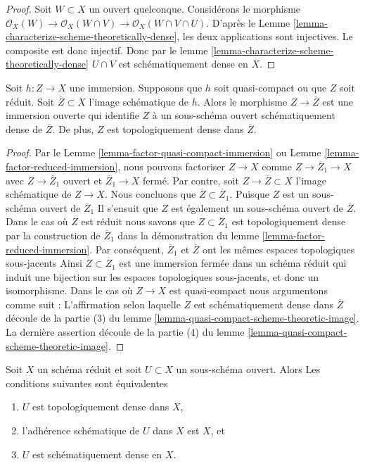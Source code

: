 \begin{proof}
Soit $W \subset X$ un ouvert
quelconque. Considérons le morphisme
$\mathcal{O}_X(W) \to \mathcal{O}_X(W \cap V)
\to \mathcal{O}_X(W \cap V \cap U)$. D'après le Lemme \ref{lemma-characterize-scheme-theoretically-dense},
les deux applications sont injectives.
Le composite est donc injectif. Donc
par le lemme \ref{lemma-characterize-scheme-theoretically-dense} $U \cap V$ est schématiquement
dense en $X$.
\end{proof}

\begin{lemma}
\label{lemma-quasi-compact-immersion}
Soit $h : Z \to X$ une immersion. Supposons que $h$ soit quasi-compact
ou que $Z$ soit réduit. Soit $\overline{Z} \subset X$ l'image schématique de
$h$. Alors le morphisme $Z \to \overline{Z}$ est une immersion ouverte qui identifie
$Z$ à un sous-schéma ouvert schématiquement
dense de $\overline{Z}$. De plus, $Z$ est topologiquement
dense dans $\overline{Z}$.
\end{lemma}

\begin{proof}
Par le Lemme \ref{lemma-factor-quasi-compact-immersion} ou Lemme \ref{lemma-factor-reduced-immersion}, nous
pouvons factoriser $Z \to X$ comme $Z \to \overline{Z}_1 \to X$
avec $Z \to \overline{Z}_1$ ouvert et $\overline{Z}_1 \to X$ fermé. Par contre, soit
$Z \to \overline{Z} \subset X$ l'image schématique de $Z \to X$. Nous
concluons que $\overline{Z} \subset \overline{Z}_1$. Puisque $Z$ est un sous-schéma
ouvert de $\overline{Z}_1$ Il s'ensuit que $Z$
est également un sous-schéma ouvert de $\overline{Z}$.
Dans le cas où $Z$ est réduit nous savons
que $Z \subset \overline{Z}_1$ est topologiquement dense par la construction
de $\overline{Z}_1$ dans la démonstration du lemme \ref{lemma-factor-reduced-immersion}.
Par conséquent, $\overline{Z}_1$ et $\overline{Z}$ ont
les mêmes espaces topologiques sous-jacents
Ainsi $\overline{Z} \subset \overline{Z}_1$ est une immersion fermée dans un schéma réduit
qui induit une bijection sur les espaces topologiques sous-jacents,
et donc un isomorphisme. Dans le cas où $Z \to X$
est quasi-compact nous argumentons comme suit
: L'affirmation selon laquelle $Z$ est
schématiquement dense
dans $\overline{Z}$ découle de la partie (3) du lemme \ref{lemma-quasi-compact-scheme-theoretic-image}.
La dernière assertion
découle de la partie (4) du lemme \ref{lemma-quasi-compact-scheme-theoretic-image}.
\end{proof}

\begin{lemma}
\label{lemma-reduced-scheme-theoretically-dense}
Soit $X$ un schéma réduit et soit $U \subset X$ un sous-schéma ouvert. Alors Les
conditions suivantes sont équivalentes
\begin{enumerate}
\item $U$ est topologiquement dense dans $X$,
\item l'adhérence schématique de $U$ dans $X$ est $X$, et
\item $U$ est schématiquement dense en $X$.
\end{enumerate}
\end{lemma}

